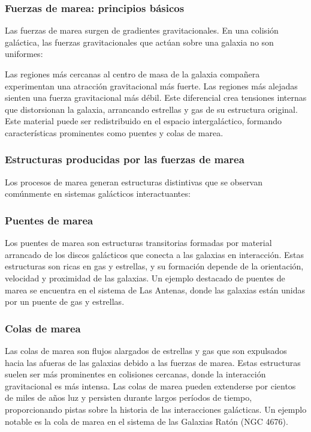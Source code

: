 \documentclass{article}
\begin{document}
\subsubsection{Fuerzas de marea: principios básicos}
Las fuerzas de marea surgen de gradientes gravitacionales. En una colisión galáctica, las fuerzas gravitacionales que actúan sobre una galaxia no son uniformes:

Las regiones más cercanas al centro de masa de la galaxia compañera experimentan una atracción gravitacional más fuerte.
Las regiones más alejadas sienten una fuerza gravitacional más débil.
Este diferencial crea tensiones internas que distorsionan la galaxia, arrancando estrellas y gas de su estructura original. Este material puede ser redistribuido en el espacio intergaláctico, formando características prominentes como puentes y colas de marea.

\subsubsection{Estructuras producidas por las fuerzas de marea}
Los procesos de marea generan estructuras distintivas que se observan comúnmente en sistemas galácticos interactuantes:

\subsubsection{Puentes de marea}
Los puentes de marea son estructuras transitorias formadas por material arrancado de los discos galácticos que conecta a las galaxias en interacción. Estas estructuras son ricas en gas y estrellas, y su formación depende de la orientación, velocidad y proximidad de las galaxias. Un ejemplo destacado de puentes de marea se encuentra en el sistema de Las Antenas, donde las galaxias están unidas por un puente de gas y estrellas.

\subsubsection{Colas de marea}
Las colas de marea son flujos alargados de estrellas y gas que son expulsados hacia las afueras de las galaxias debido a las fuerzas de marea. Estas estructuras suelen ser más prominentes en colisiones cercanas, donde la interacción gravitacional es más intensa. Las colas de marea pueden extenderse por cientos de miles de años luz y persisten durante largos períodos de tiempo, proporcionando pistas sobre la historia de las interacciones galácticas. Un ejemplo notable es la cola de marea en el sistema de las Galaxias Ratón (NGC 4676).
\end{document}
